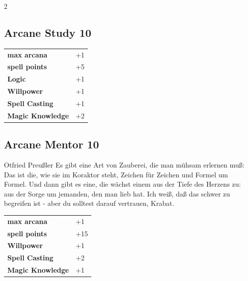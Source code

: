 \begin{multicols}{2}
\begin{tcolorbox}
\end{tcolorbox}

\begin{tcolorbox}
    \subsection*{Arcane Study \hfill \small{10 }}
    \tcblower




\begin{tabular}{@{}ll@{}}
    \textbf{max arcana} & +1\\
    \textbf{spell points} & +5\\
    \textbf{Logic} & +1\\
    \textbf{Willpower} & +1\\
    \textbf{Spell Casting} & +1\\
    \textbf{Magic Knowledge} & +2\\
\end{tabular}


\end{tcolorbox}

\begin{tcolorbox}
    \subsection*{Arcane Mentor \hfill \small{10 }}
    \tcblower


\begin{pquote}{Otfried Preußler}
Es gibt eine Art von Zauberei, die man mühsam erlernen muß: Das ist die, wie sie im Koraktor steht, Zeichen für Zeichen und Formel um Formel. Und dann gibt es eine, die wächst einem aus der Tiefe des Herzens zu: aus der Sorge um jemanden, den man lieb hat. Ich weiß, daß das schwer zu begreifen ist - aber du solltest darauf vertrauen, Krabat.
\end{pquote}

\vspace{3mm}

\begin{tabular}{@{}ll@{}}
    \textbf{max arcana} & +1\\
    \textbf{spell points} & +15\\
    \textbf{Willpower} & +1\\
    \textbf{Spell Casting} & +2\\
    \textbf{Magic Knowledge} & +1\\
\end{tabular}


\end{tcolorbox}
\end{multicols}
